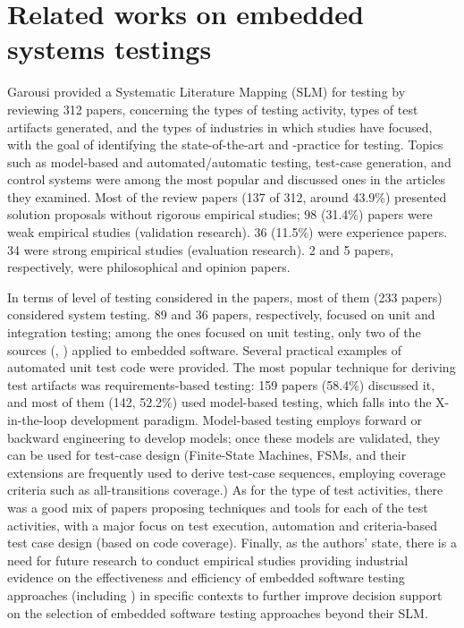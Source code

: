 \section{Related works on embedded systems testings}
Garousi \etal \cite{DBLP:journals/infsof/GarousiFKY18} provided a Systematic Literature Mapping (SLM) for \es testing by reviewing 312 papers, concerning the types of testing activity, types of test artifacts generated, and the types of industries in which studies have focused, with the goal of identifying the state-of-the-art and -practice for \ess testing.
Topics such as model-based and automated/automatic testing, test-case generation, and control systems were among the most popular and discussed ones in the articles they examined. Most of the review papers (137 of 312, around 43.9\%) presented solution proposals without rigorous empirical studies; 98 (31.4\%) papers were weak empirical studies (validation research). 36 (11.5\%) were experience papers. 34 were strong empirical studies (evaluation research). 2 and 5 papers, respectively, were philosophical and opinion papers.

In terms of level of testing considered in the papers, most of them (233 papers) considered system testing. 89 and 36 papers, respectively, focused on unit and integration testing; among the ones focused on unit testing, only two of the sources (\cite{4428578}, \cite{DBLP:conf/isese/GuanOA06}) applied \tdd to embedded software. 
Several practical examples of automated unit test code were provided.
The most popular technique for deriving test artifacts was requirements-based testing: 159 papers (58.4\%) discussed it, and most of them (142, 52.2\%) used model-based testing, which falls into the X-in-the-loop development paradigm.
Model-based testing employs forward or backward engineering to develop models; once these models are validated, they can be used for test-case design (\eg Finite-State Machines, FSMs, and their extensions are frequently used to derive test-case sequences, employing coverage criteria such as all-transitions coverage.)
As for the type of test activities, there was a good mix of papers proposing techniques and tools for each of the test activities, with a major focus on test execution, automation and criteria-based test case design (\eg based on code coverage).
Finally, as the authors' state, there is a need for future research to conduct empirical studies providing industrial evidence on the effectiveness and efficiency of embedded software testing approaches (including \tdd) in specific contexts to further improve decision support on the selection of embedded software testing approaches beyond their SLM.
